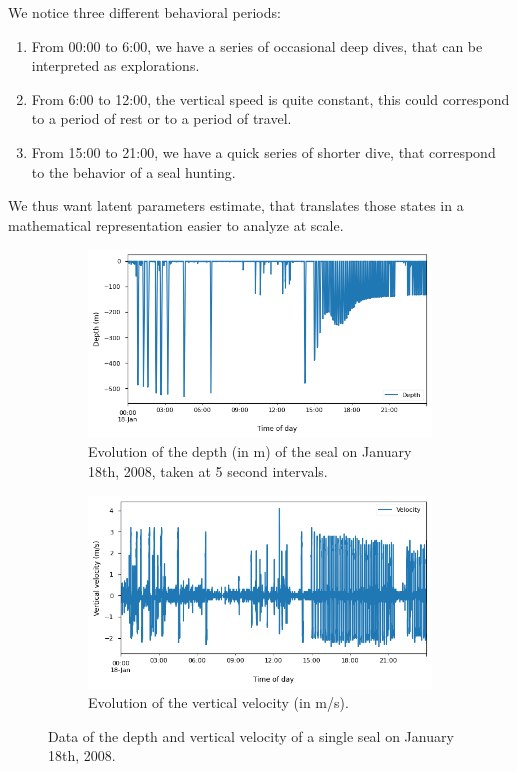 We notice three different behavioral periods:
\begin{enumerate}
    \item From 00:00 to 6:00, we have a series of occasional deep dives, that can be interpreted as explorations.
    \item From 6:00 to 12:00, the vertical speed is quite constant, this could correspond to a period of rest or to a period of travel.
    \item From 15:00 to 21:00, we have a quick series of shorter dive, that correspond to the behavior of a seal hunting.
\end{enumerate}

We thus want latent parameters estimate, that translates those states in a mathematical representation easier to analyze at scale.

\begin{figure}
\centering
    \begin{subfigure}[t]{0.45\linewidth}
        \centering
        \includegraphics[width=\linewidth]{images/depth_fig.png}
        \caption{Evolution of the depth (in m) of the seal on January 18th, 2008, taken at 5 second intervals.}
        \label{fig:depth}
    \end{subfigure}
    \begin{subfigure}[t]{0.45\linewidth}
        \centering
        \includegraphics[width=\linewidth]{images/velocity_fig.png}
        \caption{Evolution of the vertical velocity (in m/s).}
        \label{fig:velocity}
    \end{subfigure}
\caption{Data of the depth and vertical velocity of a single seal on January 18th, 2008.}
\label{fig:data}
\end{figure}

